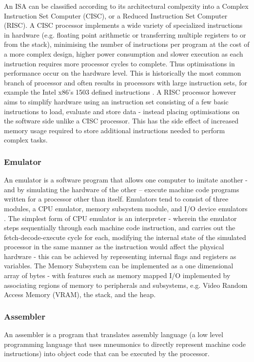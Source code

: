 An ISA can be classified according to its architectural comlpexity into a Complex Instruction Set Computer (CISC), or a Reduced Instruction Set Computer (RISC). A CISC processor implements a wide variety of specialized instructions in hardware (e.g. floating point arithmetic or transferring multiple registers to or from the stack), minimising the number of instructions per program at the cost of a more complex design, higher power consumption and slower execution as each instruction requires more processor cycles to complete. \textcite{gfg-risc-vs-cisc} Thus optimisations in performance occur on the hardware level. This is historically the most common branch of processor and often results in processors with large instruction sets, for example the Intel x86's 1503 defined instructions \textcite{ryg-blog}. A RISC processor however aims to simplify hardware using an instruction set consisting of a few basic instructions to load, evaluate and store data - instead placing optimisations on the software side unlike a CISC processor. This has the side effect of increased memory usage required to store additional instructions needed to perform complex tasks.

\subsubsection{Emulator}
\label{sec:Emulator}
An emulator is a software program that allows one computer to imitate another - and by simulating the hardware of the other – execute machine code programs written for a processor other than itself. Emulators tend to consist of three modules, a CPU emulator, memory subsystem module, and I/O device emulators \textcite{retroreversing}. The simplest form of CPU emulator is an interpreter - wherein the emulator steps sequentially through each machine code instruction, and carries out the fetch-decode-execute cycle for each, modifying the internal state of the simulated processor in the same manner as the instruction would affect the physical hardware - this can be achieved by representing internal flags and registers as variables. The Memory Subsystem can be implemented as a one dimensional array of bytes - with features such as memory mapped I/O implemented by associating regions of memory to peripherals and subsystems, e.g. Video Random Access Memory (VRAM), the stack, and the heap. 

\subsubsection{Assembler}
\label{sec:Assembler}
An assembler is a program that translates assembly language (a low level programming language that uses mneumonics to directly represent machine code instructions) into object code that can be executed by the processor. 

